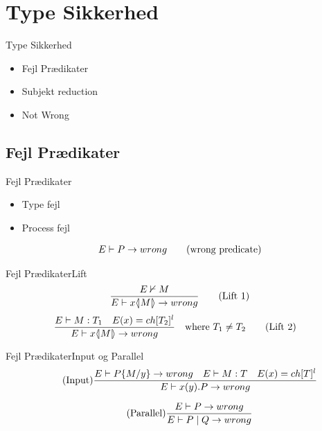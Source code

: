 \section{Type Sikkerhed}
\begin{frame}{Type Sikkerhed}
\begin{itemize}
\item Fejl Prædikater
\item Subjekt reduction
\item Not Wrong

\end{itemize}
\end{frame}

\subsection{Fejl Prædikater}
\begin{frame}{Fejl Prædikater}
\begin{itemize}
	\item Type fejl
	\item Process fejl
\end{itemize}
\begin{align}
	E \vdash P \rightarrow wrong \tag{wrong predicate}
\end{align}
\end{frame}

\begin{frame}{Fejl Prædikater}{Lift}
\begin{align}
	\frac{E \nvdash M}{E \vdash x \langle \! | M | \! \rangle \rightarrow wrong} \tag{Lift 1}
\end{align}
\begin{align}
	\frac{E \vdash M:T_1 \quad E(x)=ch[T_2]^l}{E \vdash x \langle \! | M | \! \rangle \rightarrow wrong} &\quad \text{where}\ T_1 \neq T_2\tag{Lift 2}
\end{align}
\end{frame}

\begin{frame}{Fejl Prædikater}{Input og Parallel}
\begin{align}
	\tag{Input}\frac{E \vdash P\{ M/ y\} \rightarrow wrong \quad E \vdash M:T \quad E(x)= ch[T]^l} {E \vdash x(y).P \rightarrow wrong}
\end{align}

\begin{align}
	\tag{Parallel}\frac{E \vdash P \rightarrow wrong}{E \vdash P \mid Q \rightarrow wrong}
\end{align}
\end{frame}


